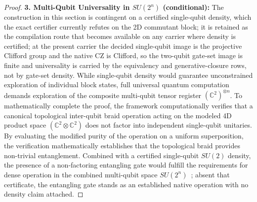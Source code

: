 \begin{proof}
\textbf{3. Multi-Qubit Universality in \texorpdfstring{$SU(2^n)$}{SU (2n)} (conditional):} The construction in this section is contingent on a certified single-qubit density, which the exact certifier currently refutes on the 2D commutant block; it is retained as the compilation route that becomes available on any carrier where density is certified; at the present carrier the decided single-qubit image is the projective Clifford group and the native CZ is Clifford, so the two-qubit gate-set image is finite and universality is carried by the equivalency and generative-closure rows, not by gate-set density. While single-qubit density would guarantee unconstrained exploration of individual block states, full universal quantum computation demands exploration of the composite multi-qubit tensor register ${(\mathbb{C}^2)}^{\otimes n}$. To mathematically complete the proof, the framework computationally verifies that a canonical topological inter-qubit braid operation acting on the modeled 4D product space $(\mathbb{C}^2 \otimes \mathbb{C}^2)$ does not factor into independent single-qubit unitaries. By evaluating the modified purity of the operation on a uniform superposition, the verification mathematically establishes that the topological braid provides non-trivial entanglement. Combined with a certified single-qubit $SU(2)$ density, the presence of a non-factoring entangling gate would fulfill the requirements for dense operation in the combined multi-qubit space $SU(2^n)$~\cite{dawson2005}; absent that certificate, the entangling gate stands as an established native operation with no density claim attached.
\end{proof}

